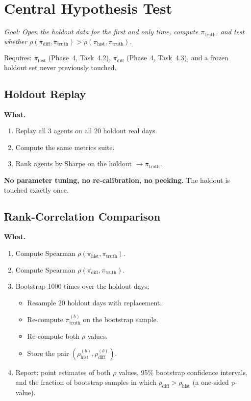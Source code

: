\documentclass[11pt,a4paper]{article}
\begin{document}
\section{Central Hypothesis Test}

\textit{Goal: Open the holdout data for the first and only time, compute $\pi_{\text{truth}}$, and test whether $\rho(\pi_{\text{diff}}, \pi_{\text{truth}}) > \rho(\pi_{\text{hist}}, \pi_{\text{truth}})$.}

\begin{depbox}
  Requires: $\pi_{\text{hist}}$ (Phase~4, Task~4.2), $\pi_{\text{diff}}$ (Phase~4, Task~4.3), and a frozen holdout set never previously touched.
\end{depbox}

\subsection{Holdout Replay}

\textbf{What.}
\begin{enumerate}[nosep]
  \item Replay all 3 agents on all 20 holdout real days.
  \item Compute the same metrics suite.
  \item Rank agents by Sharpe on the holdout $\to \pi_{\text{truth}}$.
\end{enumerate}

\textbf{No parameter tuning, no re-calibration, no peeking.}  The holdout is touched exactly once.

\subsection{Rank-Correlation Comparison}

\textbf{What.}
\begin{enumerate}[nosep]
  \item Compute Spearman $\rho(\pi_{\text{hist}}, \pi_{\text{truth}})$.
  \item Compute Spearman $\rho(\pi_{\text{diff}}, \pi_{\text{truth}})$.
  \item Bootstrap 1000 times over the holdout days:
    \begin{itemize}[nosep]
      \item Resample 20 holdout days with replacement.
      \item Re-compute $\pi_{\text{truth}}^{(b)}$ on the bootstrap sample.
      \item Re-compute both $\rho$ values.
      \item Store the pair $(\rho_{\text{hist}}^{(b)}, \rho_{\text{diff}}^{(b)})$.
    \end{itemize}
  \item Report: point estimates of both $\rho$ values, 95\% bootstrap confidence intervals, and the fraction of bootstrap samples in which $\rho_{\text{diff}} > \rho_{\text{hist}}$ (a one-sided p-value).
\end{enumerate}
\end{document}
